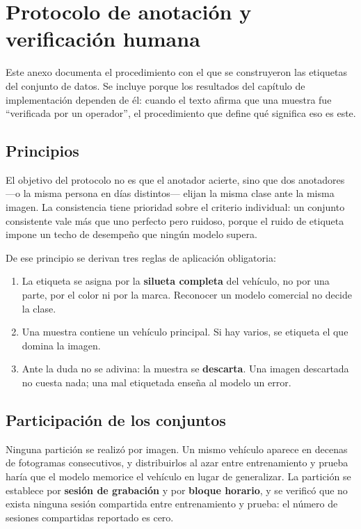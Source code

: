 \chapter{Protocolo de anotación y verificación humana}

Este anexo documenta el procedimiento con el que se construyeron las etiquetas
del conjunto de datos. Se incluye porque los resultados del capítulo de
implementación dependen de él: cuando el texto afirma que una muestra fue
``verificada por un operador'', el procedimiento que define qué significa eso es
este.

\section{Principios}

El objetivo del protocolo no es que el anotador acierte, sino que dos anotadores
---o la misma persona en días distintos--- elijan la misma clase ante la misma
imagen. La consistencia tiene prioridad sobre el criterio individual: un conjunto
consistente vale más que uno perfecto pero ruidoso, porque el ruido de etiqueta
impone un techo de desempeño que ningún modelo supera.

De ese principio se derivan tres reglas de aplicación obligatoria:

\begin{enumerate}
    \item La etiqueta se asigna por la \textbf{silueta completa} del vehículo, no
        por una parte, por el color ni por la marca. Reconocer un modelo
        comercial no decide la clase.
    \item Una muestra contiene un vehículo principal. Si hay varios, se etiqueta
        el que domina la imagen.
    \item Ante la duda no se adivina: la muestra se \textbf{descarta}. Una imagen
        descartada no cuesta nada; una mal etiquetada enseña al modelo un error.
\end{enumerate}

\section{Participación de los conjuntos}

Ninguna partición se realizó por imagen. Un mismo vehículo aparece en decenas de
fotogramas consecutivos, y distribuirlos al azar entre entrenamiento y prueba
haría que el modelo memorice el vehículo en lugar de generalizar. La partición se
establece por \textbf{sesión de grabación} y por \textbf{bloque horario}, y se
verificó que no exista ninguna sesión compartida entre entrenamiento y prueba: el
número de sesiones compartidas reportado es cero.


